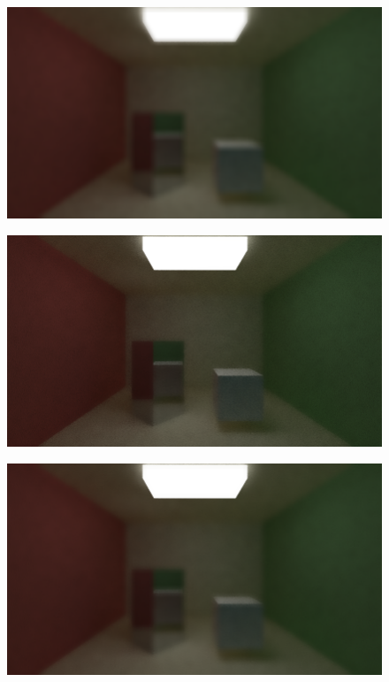 \documentclass[titlepage,12pt]{report}
\begin{document}
\begin{appendices}
\begin{figure}[H]
	\centering
	\includegraphics[scale=0.5]{media/bilateral/cornell_normal_50_bilateral_filter_21_10_60.png}
	\label{ap36}
\end{figure}

\begin{figure}[H]
	\centering
	\includegraphics[scale=0.5]{media/bilateral/cornell_normal_50_bilateral_filter_21_15_10.png}
	\label{ap37}
\end{figure}

\begin{figure}[H]
	\centering
	\includegraphics[scale=0.5]{media/bilateral/cornell_normal_50_bilateral_filter_21_15_20.png}
	\label{ap38}
\end{figure}


\end{appendices}
\end{document}
